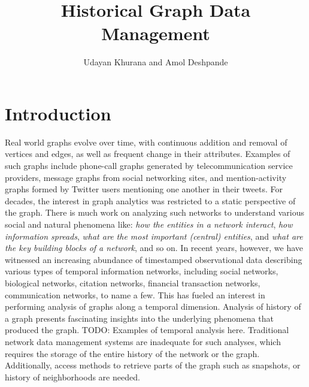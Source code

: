 \documentclass{svjour3}
\begin{document}
\title{Historical Graph Data Management}
\author{Udayan Khurana and Amol Deshpande}
%
%
\maketitle


\section{Introduction}
Real world graphs evolve over time, with continuous addition and removal of vertices and edges, as well as frequent change in their attributes. Examples of such graphs include phone-call graphs generated by telecommunication service providers, message graphs from social networking sites, and mention-activity graphs formed by Twitter users mentioning one another in their tweets.
For decades, the interest in graph analytics was restricted to a static perspective of the graph. There is much work on analyzing such networks to understand various social
and natural phenomena like: {\em how the entities in a network interact}, {\em how information
spreads}, {\em what are the most important (central) entities}, and {\em what are the key building
blocks of a network}, and so on. 
In recent years, however, we have witnessed an increasing abundance of timestamped observational data describing
various types of temporal information networks, including social networks, biological networks,
citation networks, financial transaction networks, communication networks, to
name a few. This has fueled an interest in performing analysis of graphs along a temporal dimension. Analysis of history of a graph presents fascinating insights into the underlying phenomena that produced the graph. 
TODO: Examples of temporal analysis here. 
Traditional network data management systems are inadequate for such analyses, which  requires the storage of the entire history of the network or the graph. Additionally, access methods to retrieve parts of the graph such as snapshots, or history of neighborhoods are needed. 
\end{document}
